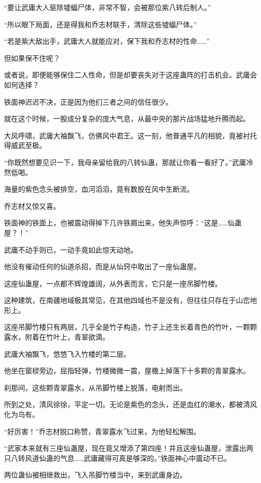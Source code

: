 \begin{this_body}
“要让武庸大人驱除墟蝠尸体，非常不智，会被那位紫八转后制人。”

“所以眼下局面，还是得我和乔志材联手，清除这些墟蝠尸体。”

“若是紫大敌出手，武庸大人就能应对，保下我和乔志材的性命……”

但如果保不住呢？

或者说，即便能够保住二人性命，但是却要丧失对于这座蛊阵的打击机会。武庸会如何选择？

铁面神迟迟不决，正是因为他们三者之间的信任很少。

就在这个时候，一股成分复杂的庞大气息，从最中央的那片战场猛地升腾而起。

大风呼啸，武庸大袖飘飞，仿佛风中君王。这一刻，他普通平凡的相貌，竟被衬托得威武至极。

“你既然想要见识一下，我母亲留给我的八转仙蛊，那就让你看一看好了。”武庸冷然低喝。

海量的紫色念头被排空，血河滔滔，竟有数股在风中生断流。

乔志材又惊又喜。

铁面神的铁面上，也被震动得掉下几许铁屑出来，他失声惊呼：“这是……仙蛊屋？！”

武庸不动手则已，一动手竟如此惊天动地。

他没有催动任何的仙道杀招，而是从仙窍中取出了一座仙蛊屋。

这座仙蛊屋，一点都不辉煌雄阔，从外表而言，它只是一座吊脚竹楼。

这种建筑，在南疆地域极其常见，在其他四域也不是没有，但往往只存在于山峦地形上。

这座吊脚竹楼只有两层，几乎全是竹子构造，竹子上还生长着青色的竹叶，一颗颗露水，附着在竹叶上，青翠欲滴。

武庸大袖飘飞，悠悠飞入竹楼的第二层。

他坐在窗棂旁边，屈指轻弹，竹楼微微一震，屋檐上掉落下十多颗的青翠露水。

刹那间，这些颗青翠露水，从吊脚竹楼上脱落，电射而出。

所到之处，清风徐徐，平定一切。无论是紫色的念头，还是血红的潮水，都被清风化为乌有。

“好厉害！”乔志材脱口称赞，青翠露水飞过来，为他轻松解围。

“武家本来就有三座仙蛊屋，现在竟又增添了第四座！并且这座仙蛊屋，泄露出两只八转风道仙蛊的气息……武庸藏得可真是够深的。”铁面神心中震动不已。

两位蛊仙被相继救出，飞入吊脚竹楼当中，来到武庸身边。


\end{this_body}
